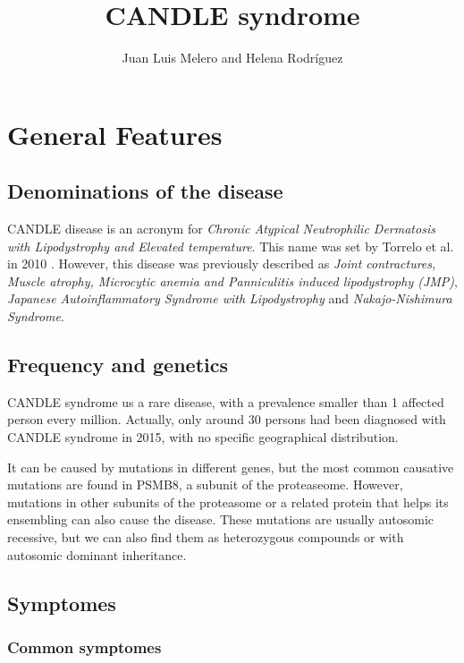 \documentclass[a4paper,10pt]{report}
\title{CANDLE syndrome}
\author{Juan Luis Melero and Helena Rodríguez}
\begin{document}
\maketitle
\tableofcontents

\begin{abstract}
\end{abstract}

\chapter{General Features}

\section{Denominations of the disease}

CANDLE disease is an acronym for \textit{Chronic Atypical Neutrophilic Dermatosis with Lipodystrophy and Elevated temperature}. This name was set by Torrelo et al. in 2010 \cite{Torrelo2010}.
However, this disease was previously described as \textit{Joint contractures, Muscle atrophy, Microcytic anemia and Panniculitis induced lipodystrophy (JMP)}, \textit{Japanese Autoinflammatory Syndrome with Lipodystrophy} and \textit{Nakajo-Nishimura Syndrome}.

\section{Frequency and genetics}

CANDLE syndrome us a rare disease, with a prevalence smaller than 1 affected person every million. Actually, only around 30 persons had been diagnosed with CANDLE syndrome in 2015, with no specific geographical distribution.\par
It can be caused by mutations in different genes, but the most common causative mutations are found in PSMB8, a subunit of the proteaseome. However, mutations in other subunits of the proteasome or a related protein that helps its ensembling can also cause the disease. These mutations are usually autosomic recessive, but we can also find them as heterozygous compounds or with autosomic dominant inheritance.

\section{Symptomes}
\subsection{Common symptomes}
\end{document}
